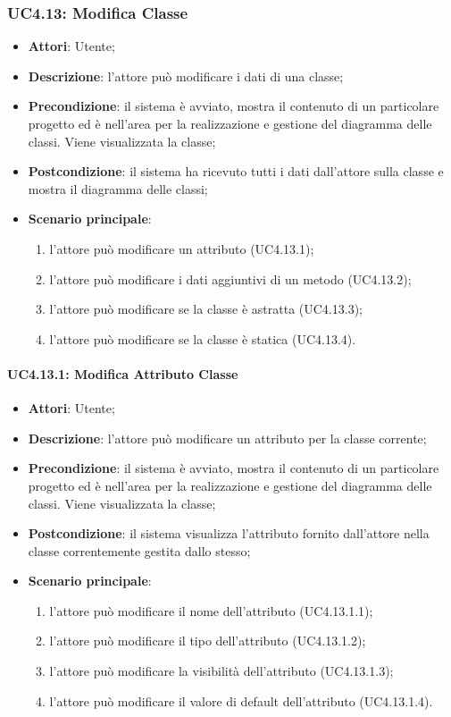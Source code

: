 \subsubsection{UC4.13: Modifica Classe}
\label{UC4.13}
\begin{itemize}
	\item \textbf{Attori}: Utente;
	\item \textbf{Descrizione}: l'attore può modificare i dati di una classe;
	\item \textbf{Precondizione}: il sistema è avviato, mostra il contenuto di un particolare progetto ed è nell'area per la realizzazione e gestione del diagramma delle classi. Viene visualizzata la classe;
	\item \textbf{Postcondizione}: il sistema ha ricevuto tutti i dati dall'attore sulla classe e mostra il diagramma delle classi;
	\item \textbf{Scenario principale}:
	\begin{enumerate}
		\item l'attore può modificare un attributo (UC4.13.1);
		\item l'attore può modificare i dati aggiuntivi di un metodo (UC4.13.2);
		\item l'attore può modificare se la classe è astratta (UC4.13.3);
		\item l'attore può modificare se la classe è statica (UC4.13.4).
	\end{enumerate}
\end{itemize}

\paragraph{UC4.13.1: Modifica Attributo Classe}
\label{UC4.13.1}
\begin{itemize}
	\item \textbf{Attori}: Utente;
	\item \textbf{Descrizione}: l'attore può modificare un attributo per la classe corrente;
	\item \textbf{Precondizione}:  il sistema è avviato, mostra il contenuto di un particolare progetto ed è nell'area per la realizzazione e gestione del diagramma delle classi. Viene visualizzata la classe;
	\item \textbf{Postcondizione}: il sistema visualizza l'attributo fornito dall'attore nella classe correntemente gestita dallo stesso;
	\item \textbf{Scenario principale}:
	\begin{enumerate}
		\item l'attore può modificare il nome dell'attributo (UC4.13.1.1);
		\item l'attore può modificare il tipo dell'attributo (UC4.13.1.2);
		\item l'attore può modificare la visibilità dell'attributo (UC4.13.1.3);
		\item l'attore può modificare il valore di default dell'attributo (UC4.13.1.4).
	\end{enumerate}
\end{itemize}

